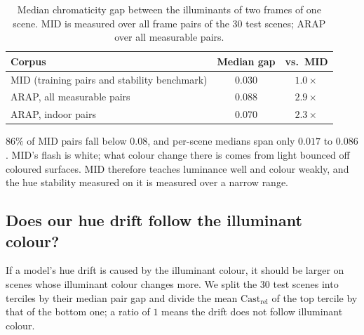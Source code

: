 \begin{table}[t!]
  \caption[Illuminant colour change between paired frames.]{%
    Median chromaticity gap between the illuminants of two frames of one scene. MID is
    measured over all frame pairs of the 30 test scenes; ARAP over all measurable pairs.
  }
  \label{tab:pair_gaps}
  \centering
  \small
  \begin{tabular}{@{}lcc@{}}
    \toprule
    Corpus & Median gap & vs.\ MID \\
    \midrule
    MID (training pairs and stability benchmark) & 0.030 & $1.0\times$ \\
    ARAP, all measurable pairs                    & 0.088 & $2.9\times$ \\
    ARAP, indoor pairs                            & 0.070 & $2.3\times$ \\
    \bottomrule
  \end{tabular}
\end{table}

$86\%$ of MID pairs fall below $0.08$, and per-scene medians span only $0.017$ to $0.086$.
MID's flash is white; what colour change there is comes from light bounced off coloured
surfaces. MID therefore teaches luminance well and colour weakly, and the hue stability
measured on it is measured over a narrow range.

\subsection{Does our hue drift follow the illuminant colour?}

If a model's hue drift is caused by the illuminant colour, it should be larger on scenes
whose illuminant colour changes more. We split the 30 test scenes into terciles by their
median pair gap and divide the mean $\text{Cast}_{\text{rel}}$ of the top tercile by that of
the bottom one; a ratio of $1$ means the drift does not follow illuminant colour.

